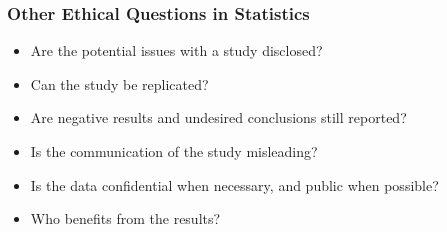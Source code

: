 \documentclass{beamer}
\begin{document}
\begin{frame}
  \frametitle{Other Ethical Questions in Statistics}
  \begin{itemize}
    \item[] 
      Are the potential issues with a study disclosed?
      \vspace{0.5cm}
    \item[] 
      Can the study be replicated?
      \vspace{0.5cm}
    \item[] 
      Are negative results and undesired conclusions still reported?
      \vspace{0.5cm}
    \item[] 
      Is the communication of the study misleading?
      \vspace{0.5cm}
    \item[] 
      Is the data confidential when necessary, and public when
      possible?
      \vspace{0.5cm}
    \item[] 
      Who benefits from the results?
  \end{itemize}
\end{frame}
\end{document}
